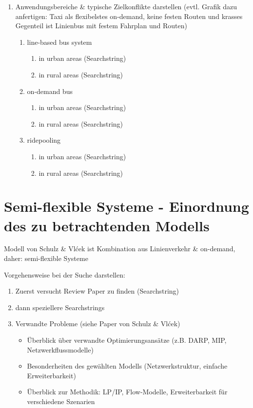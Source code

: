 \begin{enumerate}
\begin{enumerate}
        
    \end{enumerate}
    \item Anwendungsbereiche \& typische Zielkonflikte darstellen (evtl. Grafik dazu anfertigen: Taxi als flexibelstes on-demand, keine festen Routen und krasses Gegenteil ist Linienbus mit festem Fahrplan und Routen)
    \begin{enumerate}
        \item line-based bus system
        \begin{enumerate}
            \item in urban areas (Searchstring)
            \item in rural areas (Searchstring)
        \end{enumerate}
        \item on-demand bus
        \begin{enumerate}
            \item in urban areas (Searchstring)
            \item in rural areas (Searchstring)
        \end{enumerate}
        \item ridepooling
        \begin{enumerate}
            \item in urban areas (Searchstring)
            \item in rural areas (Searchstring)
        \end{enumerate}
    \end{enumerate}
\end{enumerate}


\section{Semi-flexible Systeme - Einordnung des zu betrachtenden Modells}
\label{sec:Einordnung}
\label{sec:2.2}
Modell von Schulz \& Vlćek ist Kombination aus Linienverkehr \& on-demand, daher: semi-flexible Systeme

\vspace{1em}

Vorgehensweise bei der Suche darstellen:
\begin{enumerate}
    \item Zuerst versucht Review Paper zu finden (Searchstring) 
    \item dann speziellere Searchstrings
    \item Verwandte Probleme (siehe Paper von Schulz \& Vlćek)
    \begin{itemize}
        \item Überblick über verwandte Optimierungsansätze (z.B. DARP, MIP, Netzwerkflussmodelle)
        \item Besonderheiten des gewählten Modells (Netzwerkstruktur, einfache Erweiterbarkeit)
        \item Überblick zur Methodik: LP/IP, Flow-Modelle, Erweiterbarkeit für verschiedene Szenarien
    \end{itemize}
\end{enumerate}

